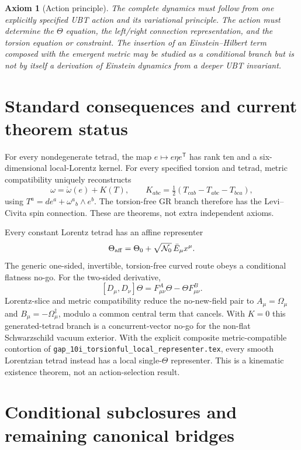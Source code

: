 \documentclass[11pt,a4paper]{article}
\newtheorem{axiom}{Axiom}
\begin{document}
\begin{axiom}[Action principle]
The complete dynamics must follow from one explicitly specified UBT action and
its variational principle.  The action must determine the $\Theta$ equation,
the left/right connection representation, and the torsion equation or
constraint.  The insertion of an Einstein--Hilbert term composed with the
emergent metric may be studied as a conditional branch but is not by itself a
derivation of Einstein dynamics from a deeper UBT invariant.
\end{axiom}

\section{Standard consequences and current theorem status}

For every nondegenerate tetrad, the map $e\mapsto e\eta e^{\mathsf T}$ has
rank ten and a six-dimensional local-Lorentz kernel.  For every specified
torsion and tetrad, metric compatibility uniquely reconstructs
\[
 \omega=\mathring\omega(e)+K(T),
 \qquad K_{abc}=\tfrac12(T_{cab}-T_{abc}-T_{bca}),
\]
using $T^a=de^a+\omega^a{}_b\wedge e^b$.  The torsion-free GR branch therefore
has the Levi--Civita spin connection.  These are theorems, not extra
independent axioms.

Every constant Lorentz tetrad has an affine representer
\[
 \Theta_{\rm aff}=\Theta_0+\sqrt{\mathcal N_0}\,\bar E_\mu x^\mu.
\]
The generic one-sided, invertible, torsion-free curved route obeys a conditional
flatness no-go.  For the two-sided derivative,
\[
 [D_\mu,D_\nu]\Theta=F^A_{\mu\nu}\Theta-\Theta F^B_{\mu\nu}.
\]
Lorentz-slice and metric compatibility reduce the no-new-field pair to
$A_\mu=\Omega_\mu$ and $B_\mu=-\Omega_\mu^\ddagger$, modulo a common
central term that cancels.  With $K=0$ this generated-tetrad branch is a
concurrent-vector no-go for the non-flat Schwarzschild vacuum exterior.  With
the explicit composite metric-compatible contortion of
\texttt{gap\_10i\_torsionful\_local\_representer.tex}, every smooth
Lorentzian tetrad instead has a local single-$\Theta$ representer.  This is a
kinematic existence theorem, not an action-selection result.

\section{Conditional subclosures and remaining canonical bridges}
\end{document}
